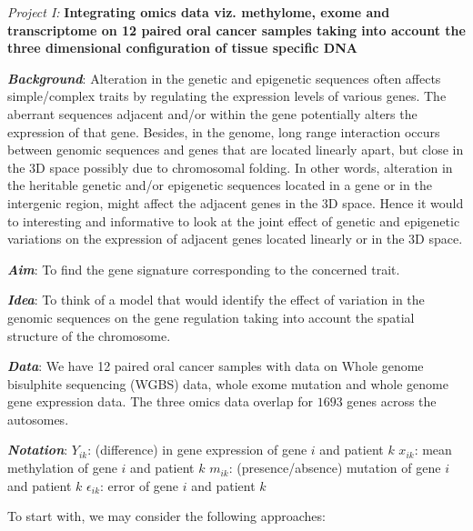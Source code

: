 \documentclass[11pt]{article}
\date{}
\theoremstyle{remark}
\begin{document}
%



\textit{Project I:} {\bf Integrating omics data viz. methylome, exome and transcriptome on 12 paired oral cancer samples taking into account the three dimensional configuration of tissue specific DNA}

{\bf \textit{Background}}: Alteration in the genetic and epigenetic sequences often affects simple/complex traits by regulating the expression levels of various genes. The aberrant sequences adjacent and/or within the gene potentially alters the expression of that gene. Besides, in the genome, long range interaction occurs between genomic sequences and genes that are located linearly apart, but close in the 3D space possibly due to chromosomal folding. In other words, alteration in the heritable genetic and/or epigenetic sequences located in a gene or in the intergenic region, might affect the adjacent genes in the 3D space. Hence it would to interesting and informative to look at the joint effect of genetic and epigenetic variations on the expression of adjacent genes located linearly or in the 3D space.

{\bf \textit{Aim}}: To find the gene signature corresponding to the concerned trait.

{\bf \textit{Idea}}: To think of a model that would identify the effect of variation in the genomic sequences on the gene regulation taking into account the spatial structure of the chromosome.

{\bf \textit{Data}}: We have 12 paired oral cancer samples with data on Whole genome bisulphite sequencing (WGBS) data, whole exome mutation and whole genome gene expression data. The three omics data overlap for $1693$ genes across the autosomes.

{\bf \textit{Notation}}: $Y_{ik}$: (difference) in gene expression of gene $i$ and patient $k$
$x_{ik}$: mean methylation of gene $i$ and patient $k$
$m_{ik}$: (presence/absence) mutation of gene $i$ and patient $k$
$\epsilon_{ik}$: error of gene $i$ and patient $k$

To start with, we may consider the following approaches:\\
\end{document}
